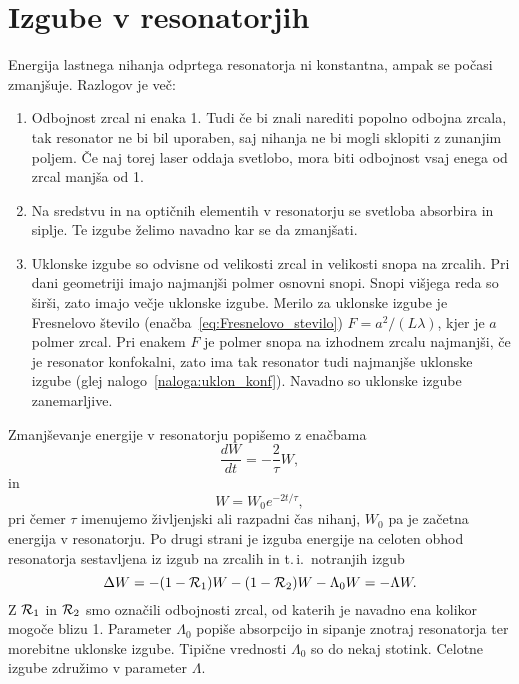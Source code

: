 \section{Izgube v resonatorjih}
Energija lastnega nihanja odprtega resonatorja ni konstantna, ampak se počasi
zmanjšuje. Razlogov je več:
\begin{enumerate}
\item Odbojnost zrcal ni enaka 1. Tudi če bi znali narediti popolno odbojna zrcala, 
tak resonator ne bi bil uporaben, saj nihanja ne bi mogli sklopiti z zunanjim poljem. Če 
naj torej laser oddaja svetlobo, mora biti odbojnost vsaj enega od zrcal manjša od 1.
\item Na sredstvu in na optičnih elementih v resonatorju se svetloba absorbira in siplje. 
Te izgube želimo navadno kar se da zmanjšati.
\item Uklonske izgube so odvisne od velikosti zrcal in velikosti snopa na zrcalih.
Pri dani geometriji imajo najmanjši polmer osnovni snopi. Snopi višjega
reda so širši, zato imajo večje uklonske izgube. Merilo za uklonske
izgube je Fresnelovo število (enačba~\ref{eq:Fresnelovo_stevilo}) 
$F=a^{2}/(L\lambda)$, kjer je $a$ polmer zrcal. Pri enakem $F$ je
polmer snopa na izhodnem zrcalu najmanjši, če je resonator konfokalni, 
zato ima tak resonator tudi najmanjše uklonske izgube (glej nalogo~\ref{naloga:uklon_konf}).
Navadno so uklonske izgube zanemarljive. 
\end{enumerate}

Zmanjševanje energije v resonatorju popišemo z enačbama 
\begin{equation}
\frac{dW}{dt}=-\frac{2}{\tau}W,
\label{eq:dW}
\end{equation}
in 
\begin{equation}
W = W_0 e^{-2t/\tau},
\label{eq:dW1}
\end{equation}
pri čemer $\tau$ imenujemo življenjski ali razpadni čas nihanj, 
$W_0$ pa je začetna energija v resonatorju.
Po drugi strani je izguba energije na celoten obhod resonatorja 
sestavljena iz izgub na zrcalih in t.\,i.\, notranjih izgub
\begin{equation}
\Delta W = -(1-{\cal R}_{1})W-(1-{\cal R}_{2})W -\Lambda_{0} W = -\Lambda W.
\label{eq:Lambda}
\end{equation}
Z ${\cal R}_{1}$ in ${\cal R}_{2}$ smo označili odbojnosti zrcal, od katerih je navadno ena
kolikor mogoče blizu 1. Parameter $\Lambda_{0}$ popiše absorpcijo in
sipanje znotraj resonatorja ter morebitne uklonske izgube. Tipične vrednosti 
$\Lambda_0$ so do nekaj stotink. Celotne izgube združimo v parameter $\Lambda$. 

